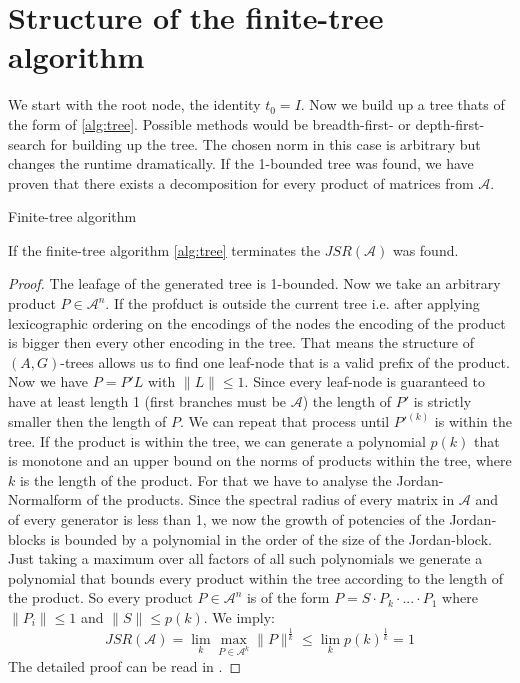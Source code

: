 \section{Structure of the finite-tree algorithm}
We start with the root node, the identity $t_0 = {I}$. Now we build up a tree thats of the form of \ref{alg:tree}.
Possible methods would be breadth-first- or depth-first-search for building up the tree. 
The chosen norm in this case is arbitrary but changes the runtime dramatically. 
If the 1-bounded tree was found, we have proven that there exists a decomposition for every product of matrices from $\mathcal{A}$.

\vspace{1cm}

\begin{algorithm}
    \caption{Finite-tree algorithm}
    \label{alg:tree}
\end{algorithm}

\vspace{1cm}

\begin{theorem}
    If the finite-tree algorithm \ref{alg:tree} terminates the $JSR(\mathcal{A})$ was found. 
\end{theorem}

\begin{proof}
    The leafage of the generated tree is 1-bounded. Now we take an arbitrary product $P \in \mathcal{A}^n$.
    If the profduct is outside the current tree i.e. after applying lexicographic ordering on the encodings of the nodes the encoding of the product is bigger then every other encoding in the tree. 
    That means the structure of $(A,G)$-trees allows us to find one leaf-node that is a valid prefix of the product. Now we have $P = P'L$ with $\lVert L \rVert \le 1$. Since every leaf-node is guaranteed to have at least length 1 (first branches must be $\mathcal{A}$) the length of $P'$ is strictly smaller then the length of $P$. We can repeat that process until $P'^{(k)}$ is within the tree.
    If the product is within the tree, we can generate a polynomial $p(k)$ that is monotone and an upper bound on the norms of products within the tree, where $k$ is the length of the product. 
    For that we have to analyse the Jordan-Normalform of the products. Since the spectral radius of every matrix in $\mathcal{A}$ and of every generator is less than 1, we now the growth of potencies of the Jordan-blocks is bounded by a polynomial in the order of the size of the Jordan-block. Just taking a maximum over all factors of all such polynomials we generate a polynomial that bounds every product within the tree according to the length of the product.  
    So every product $P \in \mathcal{A}^n$ is of the form $P = S \cdot P_k \cdot ... \cdot P_1$ where $\lVert P_i \rVert \le 1$ and $\lVert S \rVert \le p(k)$. We imply: 
    $$JSR(\mathcal{A}) = \lim_k \max_{P \in \mathcal{A}^k} \lVert P \rVert ^{\frac{1}{k}} \leq \lim_k p(k) ^{\frac{1}{k}}  = 1$$
    The detailed proof can be read in \citep{mollerTreebasedApproachJoint2014}. 
\end{proof}

